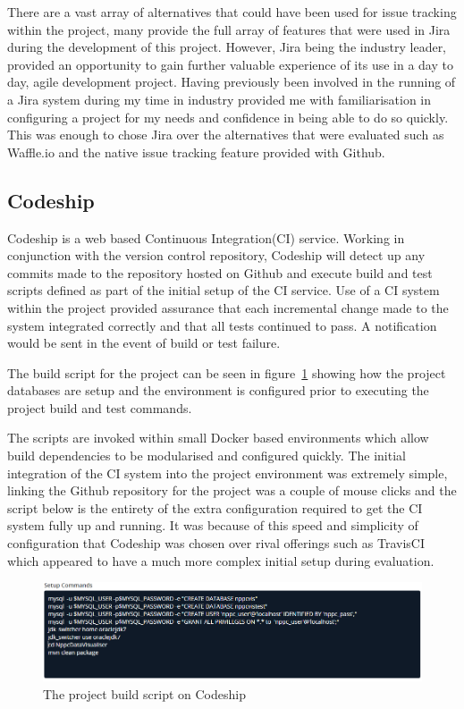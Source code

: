 There are a vast array of alternatives that could have been used for issue tracking within the project, many provide the full array of features that were used in Jira during the development of this project. However, Jira being the industry leader, provided an opportunity to gain further valuable experience of its use in a day to day, agile development project. Having previously been involved in the running of a Jira system during my time in industry provided me with familiarisation in configuring a project for my needs and confidence in being able to do so quickly. This was enough to chose Jira over the alternatives that were evaluated such as Waffle.io and the native issue tracking feature provided with Github.

\subsection{Codeship} 
Codeship\cite{_codeship} is a web based Continuous Integration(CI) service. Working in conjunction with the version control repository, Codeship will detect up any commits made to the repository hosted on Github and execute build and test scripts defined as part of the initial setup of the CI service. Use of a CI system within the project provided assurance that each incremental change made to the system integrated correctly and that all tests continued to pass. A notification would be sent in the event of build or test failure.  

 The build script for the project can be seen in figure~\ref{fig:build_script} showing how the project databases are setup and the environment is configured prior to executing the project build and test commands.

 The scripts are invoked within small Docker \cite{docker} based environments which allow build dependencies to be modularised and configured quickly. The initial integration of the CI system into the project environment was extremely simple, linking the Github repository for the project was a couple of mouse clicks and the script below is the entirety of the extra configuration required to get the CI system fully up and running. It was because of this speed and simplicity of configuration that Codeship was chosen over rival offerings such as TravisCI \cite{travis} which appeared to have a much more complex initial setup during evaluation.

\begin{figure}[H]
    \centering
    \includegraphics[width=\textwidth]{images/tools/codeShipScript}
    \caption{The project build script on Codeship}
    \label{fig:build_script}
\end{figure} 


